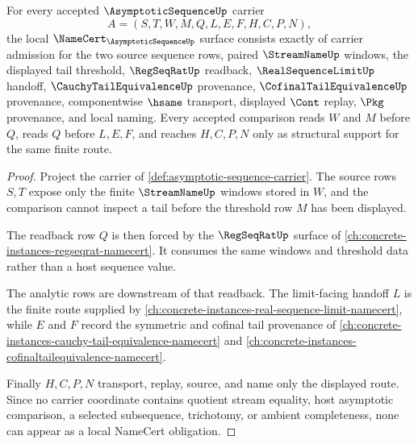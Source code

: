 \begin{theorem}
\label{thm:asymptotic-sequence-namecert-obligations}
For every accepted $\AsymptoticSequenceUp$ carrier
$$
A=(S,T,W,M,Q,L,E,F,H,C,P,N),
$$
the local $\NameCert_{\AsymptoticSequenceUp}$ surface consists exactly of carrier admission for the two source sequence rows, paired $\StreamNameUp$ windows, the displayed tail threshold, $\RegSeqRatUp$ readback, $\RealSequenceLimitUp$ handoff, $\CauchyTailEquivalenceUp$ provenance, $\CofinalTailEquivalenceUp$ provenance, componentwise $\hsame$ transport, displayed $\Cont$ replay, $\Pkg$ provenance, and local naming. Every accepted comparison reads $W$ and $M$ before $Q$, reads $Q$ before $L,E,F$, and reaches $H,C,P,N$ only as structural support for the same finite route.
\end{theorem}
\begin{proof}
Project the carrier of \autoref{def:asymptotic-sequence-carrier}. The source rows $S,T$ expose only the finite $\StreamNameUp$ windows stored in $W$, and the comparison cannot inspect a tail before the threshold row $M$ has been displayed.

The readback row $Q$ is then forced by the $\RegSeqRatUp$ surface of \autoref{ch:concrete-instances-regseqrat-namecert}. It consumes the same windows and threshold data rather than a host sequence value.

The analytic rows are downstream of that readback. The limit-facing handoff $L$ is the finite route supplied by \autoref{ch:concrete-instances-real-sequence-limit-namecert}, while $E$ and $F$ record the symmetric and cofinal tail provenance of \autoref{ch:concrete-instances-cauchy-tail-equivalence-namecert} and \autoref{ch:concrete-instances-cofinaltailequivalence-namecert}.

Finally $H,C,P,N$ transport, replay, source, and name only the displayed route. Since no carrier coordinate contains quotient stream equality, host asymptotic comparison, a selected subsequence, trichotomy, or ambient completeness, none can appear as a local NameCert obligation.
\end{proof}

